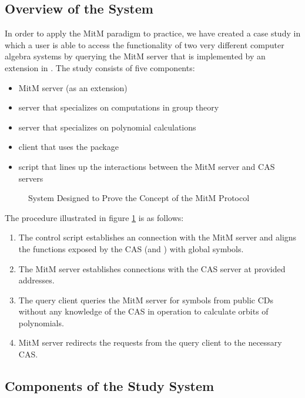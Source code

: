 \subsection{Overview of the System}
In order to apply the MitM paradigm to practice, we have created a case study 
\cite{MitM-PoC} in which a user is able to access the functionality of two very 
different computer algebra systems by querying the MitM server that is 
implemented by an extension in \MMT. The study consists of five components:
\begin{itemize}
  \item MitM server (as an \MMT extension)
  \item \GAP \SCSCP server that specializes on computations in group theory
  \item \Singular \SCSCP server that specializes on polynomial calculations
  \item \Python client that uses the \SCSCP package
  \item \Python script that lines up the interactions between the MitM server and CAS servers
\end{itemize}

\begin{figure}[ht]\centering
  \caption[\GAP-\Singular MitM Interaction]{
    System Designed to Prove the Concept of the MitM Protocol
  }\label{fig:mitmpoc}
\end{figure}

The procedure illustrated in figure \ref{fig:mitmpoc} is as follows:
\begin{enumerate}
  \item The control script establishes an \SCSCP connection with the \MMT MitM 
    server and aligns the functions exposed by the CAS (\GAP and \Singular) with
    global symbols.
  \item The MitM server establishes \SCSCP connections with the CAS server at
    provided addresses.
  \item The query client queries the MitM server for symbols from public CDs
    without any knowledge of the CAS in operation to calculate orbits of 
    polynomials.
  \item MitM server redirects the requests from the query client to the necessary
    CAS.
\end{enumerate}

\subsection{Components of the Study System}
